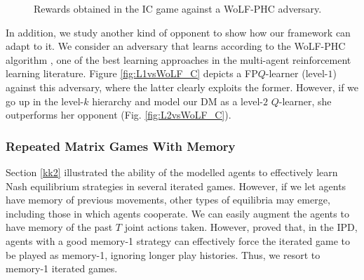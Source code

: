 \begin{figure}[!ht]%
\centering
{}%
  \caption{Rewards obtained in the IC game against a WoLF-PHC adversary. }
\end{figure}

{\color{black}
In addition, we study another kind of opponent to show how our framework
can adapt to it. We consider an adversary that learns according to the
WoLF-PHC algorithm \parencite{bowling2001rational}, one of the best learning approaches in the multi-agent reinforcement learning literature. Figure \ref{fig:L1vsWoLF_C}
depicts a FP$Q$-learner (level-$1$) against this adversary, where the latter 
clearly exploits the former. However, if we go up in the level-$k$ hierarchy and model our
DM as a level-$2$ $Q$-learner, she outperforms her
opponent (Fig. \ref{fig:L2vsWoLF_C}).}



\subsubsection{Repeated Matrix Games With Memory}\label{sec:mem}

Section \ref{kk2} illustrated the ability of the modelled agents
to effectively learn Nash equilibrium strategies in several iterated games.
However, if we let agents have memory of previous movements, other types
of equilibria may emerge, including those in which agents cooperate. We can easily augment the agents to have memory of the past $T$ joint actions taken. However, \parencite{press2012iterated} proved that, in the IPD, agents with a good memory-1 strategy can effectively force the iterated game to be played as memory-1, ignoring longer play histories. Thus, we resort to memory-1 iterated games.

